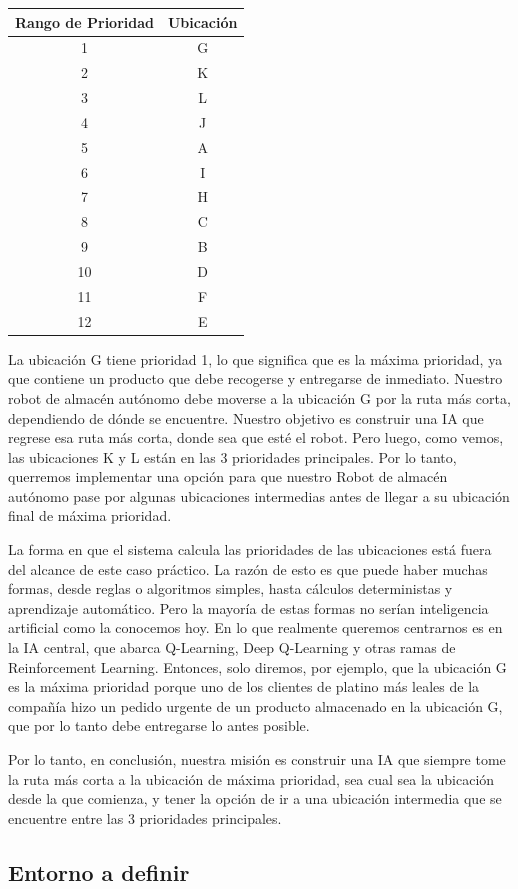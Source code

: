 \documentclass[]{book}
\begin{document}
\begin{longtable}[]{@{}cc@{}}
\toprule
\textbf{Rango de Prioridad} & \textbf{Ubicación}\tabularnewline
\midrule
\endhead
1 & G\tabularnewline
2 & K\tabularnewline
3 & L\tabularnewline
4 & J\tabularnewline
5 & A\tabularnewline
6 & I\tabularnewline
7 & H\tabularnewline
8 & C\tabularnewline
9 & B\tabularnewline
10 & D\tabularnewline
11 & F\tabularnewline
12 & E\tabularnewline
\bottomrule
\end{longtable}

La ubicación G tiene prioridad 1, lo que significa que es la máxima prioridad, ya que contiene un producto que debe recogerse y entregarse de inmediato. Nuestro robot de almacén autónomo debe moverse a la ubicación G por la ruta más corta, dependiendo de dónde se encuentre. Nuestro objetivo es construir una IA que regrese esa ruta más corta, donde sea que esté el robot. Pero luego, como vemos, las ubicaciones K y L están en las 3 prioridades principales. Por lo tanto, querremos implementar una opción para que nuestro Robot de almacén autónomo pase por algunas ubicaciones intermedias antes de llegar a su ubicación final de máxima prioridad.

La forma en que el sistema calcula las prioridades de las ubicaciones está fuera del alcance de este caso práctico. La razón de esto es que puede haber muchas formas, desde reglas o algoritmos simples, hasta cálculos deterministas y aprendizaje automático. Pero la mayoría de estas formas no serían inteligencia artificial como la conocemos hoy. En lo que realmente queremos centrarnos es en la IA central, que abarca Q-Learning, Deep Q-Learning y otras ramas de Reinforcement Learning. Entonces, solo diremos, por ejemplo, que la ubicación G es la máxima prioridad porque uno de los clientes de platino más leales de la compañía hizo un pedido urgente de un producto almacenado en la ubicación G, que por lo tanto debe entregarse lo antes posible.

Por lo tanto, en conclusión, nuestra misión es construir una IA que siempre tome la ruta más corta a la ubicación de máxima prioridad, sea cual sea la ubicación desde la que comienza, y tener la opción de ir a una ubicación intermedia que se encuentre entre las 3 prioridades principales.

\hypertarget{entorno-a-definir}{%
\subsection{Entorno a definir}\label{entorno-a-definir}}
\end{document}
